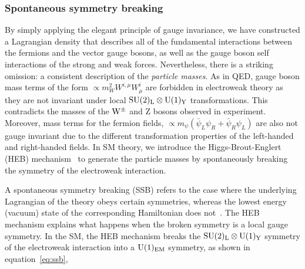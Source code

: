 

\FloatBarrier
\subsubsection{Spontaneous symmetry breaking}
By simply applying the elegant principle of gauge invariance, we have constructed a Lagrangian density that describes all of the fundamental interactions between the fermions and the vector gauge bosons, as well as the gauge boson self interactions of the strong and weak forces. Nevertheless, there is a striking omission: a consistent description of the \textit{particle masses}. As in QED, gauge boson mass terms of the form $\propto m_W^2W^{i,\mu}W^i_\mu$ are forbidden in electroweak theory as they are not invariant under local ${\rm{SU}(2)_{\rm{L}}}\otimes{\rm{U}}(1)_{\rm{Y}}$ transformations. This contradicts the masses of the ${\rm{W}}^{\pm}$ and Z bosons observed in experiment. Moreover, mass terms for the fermion fields, $\propto m_{\psi}(\bar{\psi}_L\psi_R+\bar{\psi}_R\psi_L)$ are also not gauge invariant due to the different transformation properties of the left-handed and right-handed fields. In SM theory, we introduce the Higgs-Brout-Englert (HEB) mechanism~\cite{Englert:1964et,HIGGS1964132,Higgs:1964pj,Guralnik:1964eu,PhysRev.145.1156,PhysRev.155.1554} to generate the particle masses by spontaneously breaking the symmetry of the electroweak interaction.

A spontaneous symmetry breaking (SSB) refers to the case where the underlying Lagrangian of the theory obeys certain symmetries, whereas the lowest energy (vacuum) state of the corresponding Hamiltonian does not~\cite{Aitchison:2004cs}. The HEB mechanism explains what happens when the broken symmetry is a local gauge symmetry. In the SM, the HEB mechanism breaks the ${\rm{SU}(2)_{\rm{L}}}\otimes{\rm{U}}(1)_{\rm{Y}}$ symmetry of the electroweak interaction into a ${\rm{U}}(1)_{\rm{EM}}$ symmetry, as shown in equation~\ref{eq:ssb},

